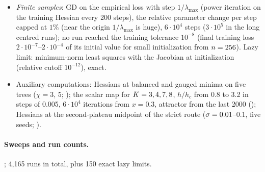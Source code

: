 \begin{itemize}
    second-moment operator (), equal to \eqref{eq:A-ms-threshold}.
  \item \emph{Finite samples}: GD on the empirical loss with step $1/\lambda_{\max}$ (power iteration on the
    training Hessian every 200 steps), the relative parameter change per step capped at $1\%$ (near the
    origin $1/\lambda_{\max}$ is huge), $6\cdot10^4$ steps ($3\cdot10^5$ in the long centred runs); no run reached
    the training tolerance $10^{-8}$ (final training loss $2\cdot10^{-7}$--$2\cdot10^{-4}$ of its initial value
    for small initialization from $n=256$). Lazy limit: minimum-norm least squares with the Jacobian at
    initialization (relative cutoff $10^{-12}$), exact.
  \item Auxiliary computations: Hessians at balanced and gauged minima on five trees ($\chi=3$, 5;
    ); the scalar map for $K=3,4,7,8$, $h/h_c$ from 0.8 to 3.2 in steps of 0.005,
    $6\cdot10^4$ iterations from $x=0.3$, attractor from the last 2000 (); Hessians at the
    second-plateau midpoint of the strict route ($\sigma=0.01$--$0.1$, five seeds; ).
\end{itemize}

\paragraph{Sweeps and run counts.}
; 4,165 runs in total, plus 150 exact lazy limits.

